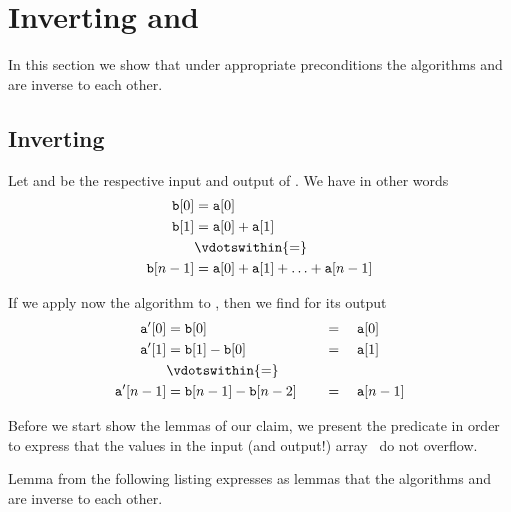 
\section{Inverting \partialsum and \adjacentdifference}


In this section we show that under appropriate preconditions
the algorithms \partialsum and\\
\adjacentdifference are inverse to each other.

\subsection{Inverting \partialsum}

Let  and  be the respective input and output 
of \partialsum.
We have in other words
\begin{align*}
   \mathtt{b}[0] &= \mathtt{a}[0] \\
   \mathtt{b}[1] &= \mathtt{a}[0] + \mathtt{a}[1] \\
                 &\vdotswithin{=} \\
   \mathtt{b}[n-1]  &= \mathtt{a}[0] + \mathtt{a}[1] + \ldots + \mathtt{a}[n-1] \\
\end{align*}

If we apply now the algorithm \adjacentdifference to , then
we find for its output 
\begin{alignat*}{3}
   \mathtt{a'}[0] &= \mathtt{b}[0]                        &\quad &=\quad \mathtt{a}[0] \\
   \mathtt{a'}[1] &= \mathtt{b}[1] - \mathtt{b}[0]        &\quad &=\quad \mathtt{a}[1] \\
                 &\vdotswithin{=}  \\
   \mathtt{a'}[n-1] &= \mathtt{b}[n-1] - \mathtt{b}[n-2]  &\quad &=\quad \mathtt{a}[n-1]
\end{alignat*}


Before we start show the \acsl lemmas of our claim, we present
the predicate  in order to express that the values
in the input (and output!) array~ do not overflow.



Lemma \PartialSumInverse from the following listing
expresses as \acsl lemmas
that the algorithms \partialsum and \adjacentdifference are inverse to each other.

